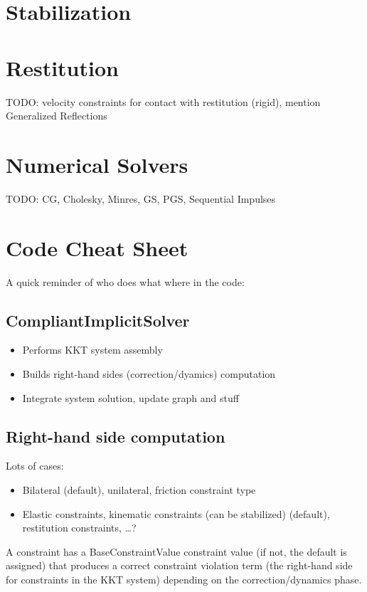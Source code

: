 \documentclass{article}
\begin{document}
\section{Stabilization}
%

\section{Restitution}
%
TODO: velocity constraints for contact with restitution (rigid),
mention Generalized Reflections
%
\section{Numerical Solvers}
\label{sec:solvers}
%
TODO: CG, Cholesky, Minres, GS, PGS, Sequential Impulses


\section{Code Cheat Sheet}

A quick reminder of who does what where in the code:

\subsection{CompliantImplicitSolver}

\begin{itemize}
\item Performs KKT system assembly
\item Builds right-hand sides (correction/dyamics) computation
\item Integrate system solution, update graph and stuff
\end{itemize}

\subsection{Right-hand side computation}

Lots of cases:
\begin{itemize}
\item Bilateral (default), unilateral, friction constraint type
\item Elastic constraints, kinematic constraints (can be stabilized) (default), restitution constraints, \ldots ?
\end{itemize}

A constraint has a BaseConstraintValue constraint value (if not, the
default is assigned) that produces a correct constraint violation term
(the right-hand side for constraints in the KKT system) depending on
the correction/dynamics phase.
\end{document}
